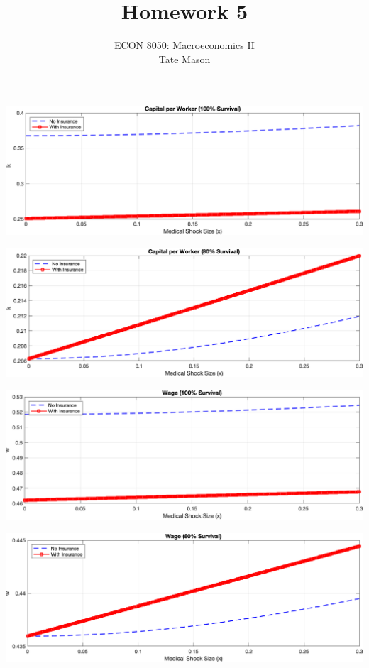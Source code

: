 \documentclass[10pt,a4paper]{article}
\begin{document}
\title{Homework 5}
\author{ECON 8050: Macroeconomics II \\ Tate Mason}
\date{}
\maketitle

\includegraphics*[width=\textwidth]{100-a.png}

\includegraphics*[width=\textwidth]{80-a.png} 

\includegraphics*[width=\textwidth]{100-b.png}

\includegraphics*[width=\textwidth]{80-b.png}
\end{document}
